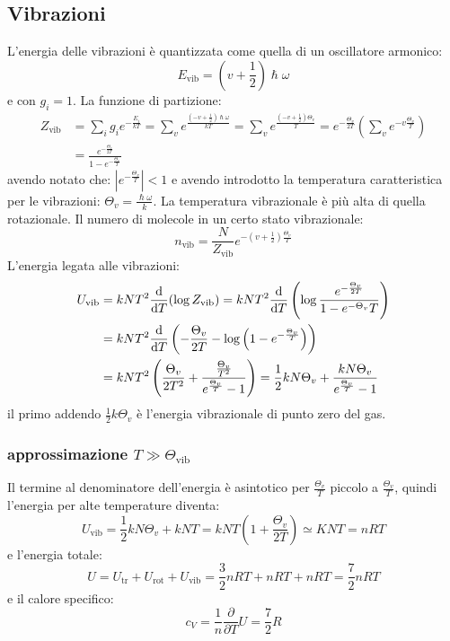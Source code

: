 \subsection{Vibrazioni}
L'energia delle vibrazioni è quantizzata come quella di un oscillatore armonico:
\begin{equation}
	E_\text{vib}=(v+\frac{1}{2})\hslash\omega
\end{equation}
e con $g_i=1$. La funzione di partizione:
\begin{equation}
	\begin{split}
		Z_\text{vib}&=\sum_i g_ie^{-\frac{E_i}{kT}}=\sum_v e^{\frac{(-v+\frac{1}{2})\hslash \omega}{kT}}=\sum_v e^{\frac{(-v+\frac{1}{2})\Theta_v}{T}}=e^{-\frac{\Theta_v}{2T}}\left(\sum_v e^{-v\frac{\Theta_v}{T}}\right)\\&=\frac{e^{-\frac{\Theta_c}{2T}}}{1-e^{-\frac{\Theta_v}{T}}}
	\end{split}
\end{equation}
avendo notato che: $|e^{-\frac{\Theta_v}{T}}|<1$ e avendo introdotto la temperatura caratteristica per le vibrazioni: $\Theta_v=\frac{\hslash\omega}{k}$. La temperatura vibrazionale è più alta di quella rotazionale. Il numero di molecole in un certo stato vibrazionale:
\begin{equation}
	n_\text{vib}=\frac{N}{Z_\text{vib}}e^{-(v+\frac{1}{2})\frac{\Theta_v}{T}}
\end{equation}
L'energia legata alle vibrazioni:
\begin{equation}
	\begin{split}
		U_\text{vib}&=kNT^2\frac{\mathrm{d}}{\mathrm{d} T}(\log Z_\text{vib})=kNT^2\frac{\mathrm{d}}{\mathrm{d} T}\left(\log \frac{e^{-\frac{\Theta_v}{2T}}}{1-e^{-\Theta_v}{T}}\right)\\
		&=kNT^2\frac{\mathrm{d}}{\mathrm{d} T}\left(-\frac{\Theta_v}{2T}-\log\left(1-e^{-\frac{\Theta_v}{T}}\right)\right)\\
		&=kNT^2\left(\frac{\Theta_v}{2T^2}+\frac{\frac{\Theta_v}{T^2}}{e^\frac{\Theta_v}{T}-1}\right)=\frac{1}{2}kN\Theta_v+\frac{kN\Theta_v}{e^{\frac{\Theta_v}{T}}-1}
	\end{split}
\end{equation}
il primo addendo $\frac{1}{2}k\Theta_v$ è l'energia vibrazionale di punto zero del gas.
\subsubsection{approssimazione $T\gg\Theta_\text{vib}$}
Il termine al denominatore dell'energia è asintotico per $\frac{\Theta_v}{T}$ piccolo a $\frac{\Theta_v}{T}$, quindi l'energia per alte temperature diventa:
\begin{equation}
	U_\text{vib}=\frac{1}{2}kN\Theta_v+kNT=kNT\left(1+\frac{\Theta_v}{2T}\right)\simeq KNT=nRT
\end{equation}
e l'energia totale:
\begin{equation}
	U=U_\text{tr}+U_\text{rot}+U_\text{vib}=\frac{3}{2}nRT+nRT+nRT=\frac{7}{2}nRT
\end{equation}
e il calore specifico:
\begin{equation}
	c_V=\frac{1}{n}\frac{\partial}{\partial T}U=\frac{7}{2}R
\end{equation}
